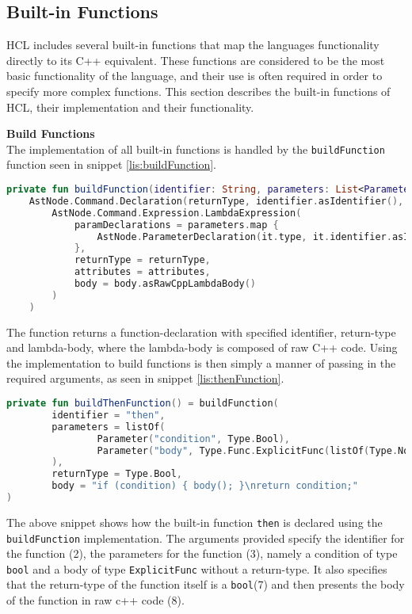 \subsection{Built-in Functions}
HCL includes several built-in functions that map the languages functionality directly to its C++ equivalent. 
These functions are considered to be the most basic functionality of the language, and their use is often required in order to specify more complex functions. 
This section describes the built-in functions of HCL, their implementation and their functionality.

\textbf{Build Functions}\\
The implementation of all built-in functions is handled by the \texttt{buildFunction} function seen in snippet \ref{lis:buildFunction}.

\begin{lstlisting}[language=Kotlin,label=lis:buildFunction,caption=The implementation of buildFunction.]
private fun buildFunction(identifier: String, parameters: List<Parameter>, returnType: Type, body: String, attributes: LambdaExpressionAttributes = BuiltinLambdaAttributes) =
    AstNode.Command.Declaration(returnType, identifier.asIdentifier(),
	    AstNode.Command.Expression.LambdaExpression(
            paramDeclarations = parameters.map {
                AstNode.ParameterDeclaration(it.type, it.identifier.asIdentifier())
            },
            returnType = returnType,
            attributes = attributes,
            body = body.asRawCppLambdaBody()
        )
    )
\end{lstlisting}
The function returns a function-declaration with specified identifier, return-type and lambda-body, where the lambda-body is composed of raw C++ code. 
Using the implementation to build functions is then simply a manner of passing in the required arguments, as seen in snippet \ref{lis:thenFunction}.

\begin{lstlisting}[language=Kotlin,label=lis:thenFunction,caption=built-in 'then' function implemented using \texttt{buildFunction}.]
private fun buildThenFunction() = buildFunction(
        identifier = "then",
        parameters = listOf(
                Parameter("condition", Type.Bool),
                Parameter("body", Type.Func.ExplicitFunc(listOf(Type.None))
        ),
        returnType = Type.Bool,
        body = "if (condition) { body(); }\nreturn condition;"
)
\end{lstlisting}
The above snippet shows how the built-in function \texttt{then} is declared using the \texttt{buildFunction} implementation. 
The arguments provided specify the identifier for the function (2), the parameters for the function (3), namely a condition of type \texttt{bool} and a body of type \texttt{ExplicitFunc} without a return-type.
It also specifies that the return-type of the function itself is a \texttt{bool}(7) and then presents the body of the function in raw c++ code (8). 

